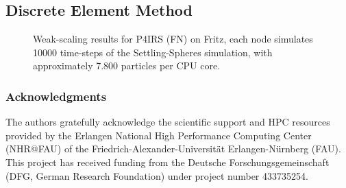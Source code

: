 \documentclass[preprint,12pt]{elsarticle}
\begin{document}
\subsection{Discrete Element Method}

%

\begin{figure}[t]
\centering
{}
\vspace{-3ex}
\caption{Weak-scaling results for P4IRS (FN) on Fritz, each node simulates 10000 time-steps of the Settling-Spheres simulation, with approximately 7.800 particles per CPU core.}
\vspace{-2ex}
\label{fig:dem_weak_scaling_fritz}
\end{figure}

\subsubsection*{Acknowledgments}

The authors gratefully acknowledge the scientific support and HPC resources provided by the Erlangen National High Performance Computing Center (NHR@FAU) of the Friedrich-Alexander-Universität Erlangen-Nürnberg (FAU).
This project has received funding from the Deutsche Forschungsgemeinschaft (DFG, German Research Foundation) under project number 433735254.
\end{document}
